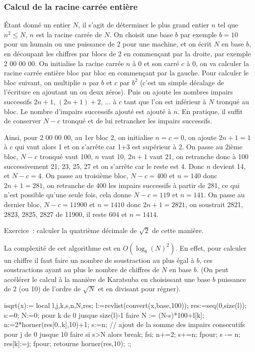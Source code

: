 \documentclass[a4paper,11pt]{article}
\begin{document}
\begin{giacjshere}
\subsubsection{Calcul de la racine carr\'ee enti\`ere}
\'Etant donn\'e un entier $N$, il s'agit de d\'eterminer le plus grand
entier $n$ tel que $n^2\leq N$, $n$ est la racine
carr\'ee de $N$.
On choisit une base $b$ par exemple $b=10$ pour un humain ou une
puissance de 2 pour une machine, et on \'ecrit $N$ en base $b$, en
d\'ecoupant les chiffres par blocs de 2 en commen\c{c}ant par la
droite, par exemple 2 00 00 00. On initialise la racine carr\'ee $n$ \`a 0
et son carr\'e $c$ \`a 0, on va calculer la racine carr\'ee enti\`ere bloc par bloc en
commen\c{c}ant par la gauche. Pour calculer le bloc suivant, on
multiplie $n$ par $b$ et $c$ par $b^2$ (c'est un simple d\'ecalage de
l'\'ecriture en ajoutant un ou deux z\'eros). Puis on ajoute les
nombres impairs successifs $2n+1$, $(2n+1)+2$, ... \`a $c$ tant que l'on est
inf\'erieur \`a $N$ tronqu\'e au bloc. Le nombre d'impairs successifs
ajout\'e est ajout\'e \`a $n$. En pratique, il suffit de conserver
$N-c$ tronqu\'e et de lui retrancher les impairs successifs.

Ainsi, pour 2 00 00 00, au 1er bloc 2, on initialise $n=c=0$, on
ajoute $2n+1=1$ \`a $c$ qui vaut alors 1 et on s'arr\^ete car 1+3
est sup\'erieur \`a 2. On passe au 2i\`eme bloc, $N-c$ tronqu\'e vaut
100, $n$ vaut 10, $2n+1$ vaut 21, on retranche donc \`a 100
successivement 21, 23, 25, 27 et on s'arr\^ete car le reste est
4. Donc $n$ devient 14, et $N-c=4$. On passe au troisi\`eme bloc,
$N-c=400$ et $n=140$ donc $2n+1=281$, on retranche de 400 les impairs
successifs \`a partir de 281, ce qui n'est possible qu'une seule fois,
cela donne $N-c=119$ et $n=141$. On passe au dernier bloc,
$N-c=11900$ et $n=1410$ donc $2n+1=2821$, on soustrait
2821, 2823, 2825, 2827 de 11900, il reste 604 et $n=1414$.

Exercice~: calculer la quatri\`eme d\'ecimale de $\sqrt{2}$ de cette
mani\`ere.

La complexit\'e de cet algorithme est en $O(\log_b(N)^2)$. En effet,
pour calculer un chiffre il faut faire un nombre de soustraction au
plus \'egal \`a $b$, ces soustractions ayant au plus le nombre de
chiffres de $N$ en base $b$.
(On peut acc\'el\'erer le calcul \`a la mani\`ere de Karatsuba en
choisissant une base $b$ puissance de 2 (ou 10) de l'ordre de
$\sqrt{N}$ et en divisant pour r\'egner).

\begin{giacprog}
isqrt(x):={
  local l,j,k,s,n,N,res;
  l:=revlist(convert(x,base,100));
  res:=seq(0,size(l));
  s:=0;
  N:=0;
  pour k de 0 jusque size(l)-1 faire
    N := (N-s)*100+l[k];
    n:=2*horner(res[0..k],10)+1;
    s:=n; // ajout de la somme des impairs consecutifs
    pour j de 0 jusque 10 faire
      si s>N alors break; fsi;
      n+=2;
      s+=n;
    fpour;
    s -= n;
    res[k]:=j;
  fpour;
  retourne horner(res,10);
}:;
\end{giacprog}


\end{giacjshere}
\end{document}
